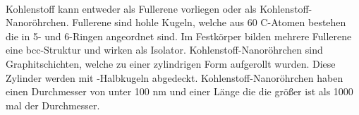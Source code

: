 \documentclass[11pt,a4paper]{article}
\numberwithin{equation}{section}
\numberwithin{figure}{section}
\begin{document}
\\
\begin{addmargin}[25pt]{0pt}
Kohlenstoff kann entweder als Fullerene  vorliegen oder als Kohlenstoff-Nanoröhrchen. Fullerene sind hohle Kugeln, welche aus 60 C-Atomen bestehen die in 5- und 6-Ringen angeordnet sind. Im Festkörper bilden mehrere Fullerene eine bcc-Struktur und wirken als Isolator. Kohlenstoff-Nanoröhrchen sind Graphitschichten, welche zu einer zylindrigen Form aufgerollt wurden. Diese Zylinder werden mit -Halbkugeln abgedeckt. Kohlenstoff-Nanoröhrchen haben einen Durchmesser von unter 100 nm  und einer Länge die die größer ist als 1000 mal der Durchmesser.\\
\end{addmargin}
\end{document}

